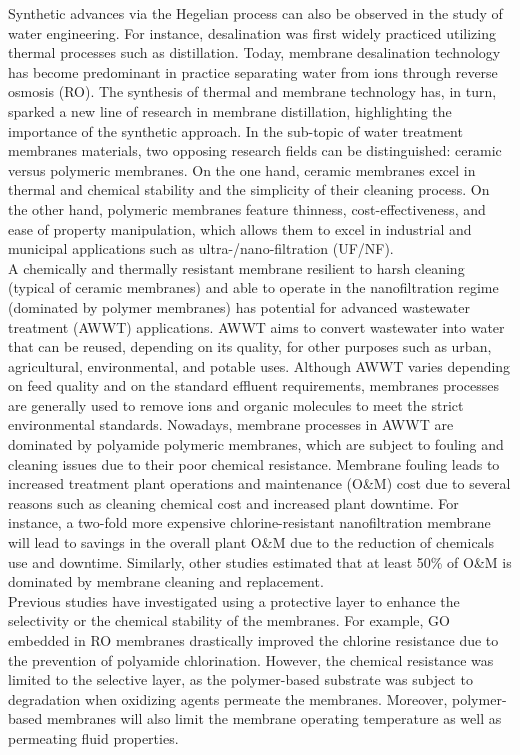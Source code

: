 Synthetic advances via the Hegelian process can also be observed in the study of water engineering. For instance, desalination was first widely practiced utilizing thermal processes such as distillation. Today, membrane desalination technology has become predominant in practice separating water from ions through reverse osmosis (RO). The synthesis of thermal and membrane technology has, in turn, sparked a new line of research in membrane distillation, highlighting the importance of the synthetic approach.\cite{bhadra2016desalination} In the sub-topic of water treatment membranes materials, two opposing research fields can be distinguished: ceramic versus polymeric membranes. On the one hand, ceramic membranes excel in thermal and chemical stability and the simplicity of their cleaning process. On the other hand, polymeric membranes feature thinness, cost-effectiveness, and  ease of property manipulation, which allows them to excel in industrial and municipal applications such as ultra-/nano-filtration (UF/NF).\cite{baker2004overview}\\
A chemically and thermally resistant membrane resilient to harsh cleaning (typical of ceramic membranes) and able to operate in the nanofiltration regime (dominated by polymer membranes) has potential for advanced wastewater treatment (AWWT) applications. AWWT aims to convert wastewater into water that can be reused, depending on its quality, for other purposes such as urban, agricultural, environmental, and potable uses. Although AWWT varies depending on feed quality and on the standard effluent requirements, membranes processes are generally used to remove ions and organic molecules to meet the strict environmental standards. Nowadays, membrane processes in AWWT are dominated by polyamide polymeric membranes, which are subject to fouling and cleaning issues due to their poor chemical resistance.\cite{safarpour2015thin} Membrane fouling leads to increased treatment plant operations and maintenance (O\&M) cost due to several reasons such as cleaning chemical cost and increased plant downtime. For instance, a two-fold more expensive chlorine-resistant nanofiltration membrane will lead to savings in the overall plant O\&M due to the reduction of chemicals use and downtime.\cite{dave2017six} Similarly, other studies estimated that at least 50\% of O\&M is dominated by membrane cleaning and replacement.\\
Previous studies have investigated using a protective layer to enhance the selectivity or the chemical stability of the membranes. For example, GO embedded in RO membranes drastically improved the chlorine resistance due to the prevention of polyamide chlorination.\cite{chae2015graphene} However, the chemical resistance was limited to the selective layer, as the polymer-based substrate was subject to degradation when oxidizing agents permeate the membranes.\cite{goh2015all,amadei2016increase} Moreover, polymer-based membranes will also limit the membrane operating temperature as well as permeating fluid properties.\\
